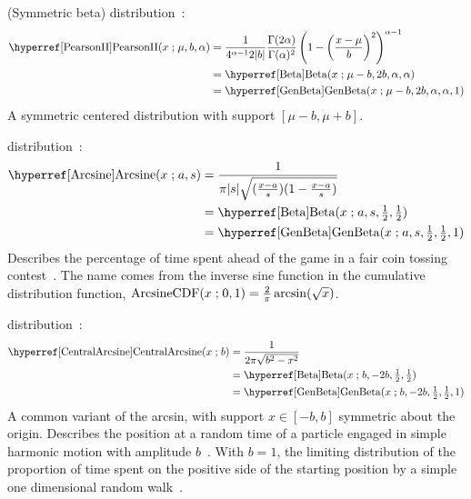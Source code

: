  (Symmetric beta) distribution~\cite{Pearson1895}: 
%
\begin{align}
\label{PearsonII}
\opr{PearsonII}(x\given \mu, b,\alpha) 
&= \frac{1}{4^{\alpha-1} 2 |b|}\frac{\Gamma(2\alpha) }{ \Gamma(\alpha)^2 } \left(1-\left(\frac{x-\mu}{ b}\right)^2 \right)^{\alpha-1}
 \\
& = \opr{Beta}(x\given \mu-b, 2b,\alpha, \alpha) \notag  \\
& = \opr{GenBeta}(x\given \mu-b, 2 b ,\alpha, \alpha,1) \notag 
\end{align}
A symmetric centered distribution with support $[\mu-b, \mu+b]$.



 distribution~\cite{Norton1975}:
\begin{align}
\label{Arcsine}
\opr{Arcsine}(x\given a, s) &= \frac{1}{\pi |s| \sqrt{(\tfrac{x-a}{s}) (1-\frac{x-a}{s} )}} \checked \\
& =\opr{Beta}(x\given a,s,   \tfrac{1}{2},  \tfrac{1}{2}) \notag \checked \\
& =\opr{GenBeta}(x\given a,s, \tfrac{1}{2}, \tfrac{1}{2},1) \notag \checked
\end{align}
Describes the percentage of time spent ahead of the game in a fair coin tossing contest~\cite{Johnson1995,Norton1975}. The name comes from the inverse sine function in the cumulative distribution function,
$
\operatorname{ArcsineCDF}(x\mathrel{;} 0,1) = \frac{2}{\pi} \operatorname{arcsin}( \sqrt{x}) 
$.



 
 distribution~\cite{Norton1975}: 
\begin{align}
\label{CentralArcsine}
\opr{CentralArcsine}(x\given b) &= \frac{1}{2 \pi  \sqrt{b^2-x^2}} \checked \\
& =\opr{Beta}(x\given b,-2b, \tfrac{1}{2}, \tfrac{1}{2})  \checked \notag \\
& =\opr{GenBeta}(x\given b,-2b, \tfrac{1}{2}, \tfrac{1}{2},1)  \checked \notag
\end{align}
A common variant of the arcsin, with support $x\in [-b,b]$ symmetric about the origin. Describes the position at a random time of a particle engaged in simple harmonic motion with amplitude $b$~\cite{Norton1975}. With $b=1$, the limiting distribution of the proportion of time spent on the positive side of the starting position by a simple one dimensional random walk~\cite{Feller1968}.


